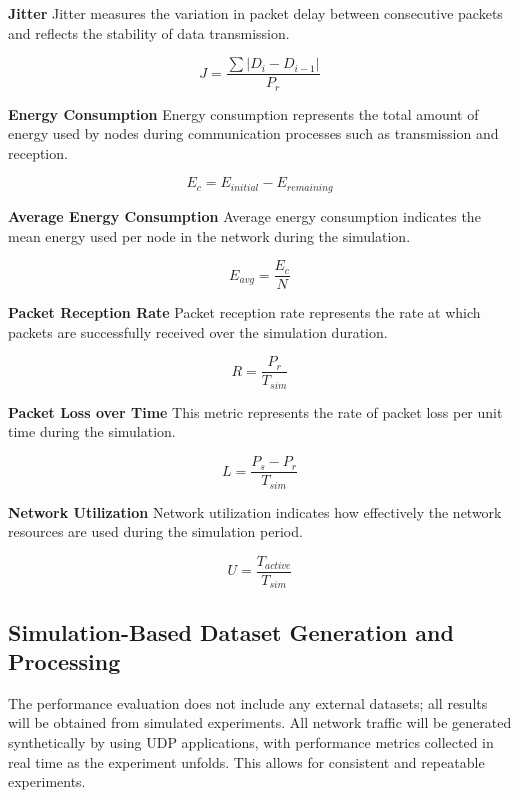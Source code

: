 \documentclass[a4paper,fleqn]{cas-dc}
\numberwithin{equation}{section}
\begin{document}
\textbf{Jitter}  
Jitter measures the variation in packet delay between consecutive packets and reflects the stability of data transmission.

\begin{equation}
J = \frac{\sum |D_i - D_{i-1}|}{P_r}
\label{eq:jitter}
\end{equation}

\textbf{Energy Consumption}  
Energy consumption represents the total amount of energy used by nodes during communication processes such as transmission and reception.

\begin{equation}
E_c = E_{initial} - E_{remaining}
\label{eq:energy}
\end{equation}

\textbf{Average Energy Consumption}  
Average energy consumption indicates the mean energy used per node in the network during the simulation.

\begin{equation}
E_{avg} = \frac{E_c}{N}
\label{eq:avgenergy}
\end{equation}

\textbf{Packet Reception Rate}  
Packet reception rate represents the rate at which packets are successfully received over the simulation duration.

\begin{equation}
R = \frac{P_r}{T_{sim}}
\label{eq:rate}
\end{equation}

\textbf{Packet Loss over Time}  
This metric represents the rate of packet loss per unit time during the simulation.

\begin{equation}
L = \frac{P_s - P_r}{T_{sim}}
\label{eq:losstime}
\end{equation}

\textbf{Network Utilization}  
Network utilization indicates how effectively the network resources are used during the simulation period.

\begin{equation}
U = \frac{T_{active}}{T_{sim}}
\label{eq:utilization}
\end{equation}
\subsection{Simulation-Based Dataset Generation and Processing}

The performance evaluation does not include any external datasets; all results will be obtained from simulated experiments. All network traffic will be generated synthetically by using UDP applications, with performance metrics collected in real time as the experiment unfolds. This allows for consistent and repeatable experiments.
\end{document}
